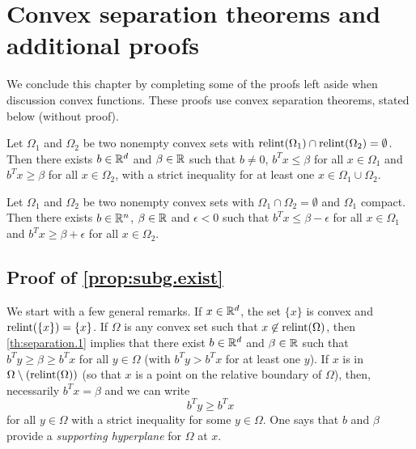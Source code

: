 \section{Convex separation theorems and additional proofs}
\label{sec:separation}

We conclude this chapter by completing some of the proofs left aside when discussion convex functions. These proofs use convex separation theorems, stated below (without proof). 
\begin{theorem}
\label{th:separation.1}
Let $\Omega_1$ and $\Omega_2$ be two nonempty convex sets with $\mathrm{relint}(\Omega_1)\cap\mathrm{relint}(\Omega_2) = \emptyset$. Then there exists $b\in {\mathbb{R}}^d$ and $\beta\in {\mathbb{R}}$ such that $b\neq 0$,  
$b^T x  \leq \beta$ for all $x\in \Omega_1$ and  $b^T x  \geq \beta$ for all $x\in \Omega_2$, with a strict inequality for at least one $x\in \Omega_1\cup \Omega_2$.
\end{theorem}

\begin{theorem}
\label{th:separation.2}
Let $\Omega_1$ and $\Omega_2$ be two nonempty convex sets with $\Omega_1\cap\Omega_2 = \emptyset$ and $\Omega_1$ compact. Then there exists $b\in {\mathbb{R}}^n$, $\beta\in {\mathbb{R}}$ and $\epsilon<0$ such that 
$b^T x  \leq \beta - \epsilon$ for all $x\in \Omega_1$ and  $b^T x \geq \beta + \epsilon$ for all $x\in \Omega_2$.
\end{theorem}



\subsection{Proof of \cref{prop:subg.exist}}

We start with a few general remarks. If $x\in {\mathbb{R}}^d$, the set $\{x\}$ is convex and $\mathrm{relint}(\{x\}) = \{x\}$. If $\Omega$ is any convex set such that $x\not\in \mathrm{relint}(\Omega)$, then \cref{th:separation.1} implies that there exist $b\in {\mathbb{R}}^d$ and $\beta \in {\mathbb{R}}$ such that $b^Ty \geq \beta \geq b^Tx$ for all $y\in \Omega$ (with $b^Ty > b^Tx$ for at least one $y$). If $x$  is in $\Omega\setminus(\mathrm{relint}(\Omega))$ (so that $x$ is a point on the relative boundary of $\Omega$), then, necessarily $b^T x = \beta$ and we can write
 \[
 b^T y \geq b^T x 
 \]
 for all $y\in \Omega$ with a strict inequality for some $y\in \Omega$. One says that $b$ and $\beta$ provide a {\em supporting hyperplane} for $\Omega$ at $x$.
 
